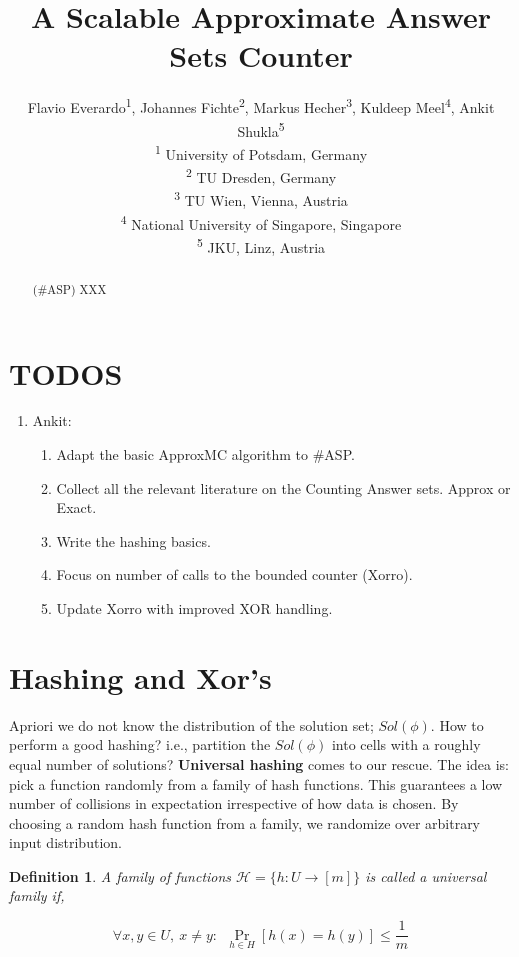 \documentclass[letterpaper]{article} %
\title{A Scalable Approximate Answer Sets Counter}
\author{Flavio Everardo\textsuperscript{\rm 1}, Johannes Fichte\textsuperscript{\rm 2}, Markus Hecher\textsuperscript{\rm 3}, Kuldeep Meel\textsuperscript{\rm 4}, Ankit Shukla\textsuperscript{\rm 5} \\ %
\textsuperscript{\rm 1} University of Potsdam, Germany\\ 
\textsuperscript{\rm 2} TU Dresden, Germany\\ 
\textsuperscript{\rm 3}  TU Wien, Vienna, Austria \\ \textsuperscript{\rm 4} National University of Singapore, Singapore \\ \textsuperscript{\rm 5} JKU, Linz, Austria
}
\def\approxmc{\textsf{ApproxMC}\xspace}
\def\asp{\textsf{\#ASP}\xspace}
\newtheorem{definition}{Definition}
\begin{document}
\maketitle

\begin{abstract}
(\asp) XXX
\end{abstract}

\section{TODOS} \label{sec:todos}
\begin{enumerate}

\item Ankit: 
  \begin{enumerate}
  \item Adapt the basic \approxmc algorithm to \asp.
  \item Collect all the relevant literature on the Counting Answer sets. Approx or Exact.
  \item Write the hashing basics. 
  \item Focus on number of calls to the bounded counter (Xorro).
  \item Update Xorro with improved XOR handling.
  \end{enumerate}
\end{enumerate}





\section{Hashing and Xor's} 
\label{sec:hashing}
Apriori we do not know the distribution of the solution set; $Sol(\phi)$. 
%
How to perform a good hashing? i.e.,  partition the $Sol(\phi)$ into cells with a roughly equal number of solutions?
%
\textbf{Universal hashing} comes to our rescue. 
%
The idea is: pick a function randomly from a family of hash functions. This guarantees a low number of collisions in expectation irrespective of how data is chosen. By choosing a random hash function from a family, we randomize over arbitrary input distribution.
%

\begin{definition}
A family of functions $\mathcal{H}=\{h: U \to [m]\}$  is called a universal family if, 

\[ \forall x,y\in U,~x\neq y:~~\Pr _{h\in H}[h(x)=h(y)]\leq {\frac {1}{m}} \]

\end{definition}
\end{document}
